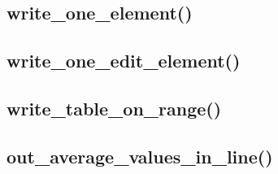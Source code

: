 \documentclass[12pt, a4paper]{article}
\begin{document}





\subsection{write\_one\_element()}






\subsection{write\_one\_edit\_element()}






\subsection{write\_table\_on\_range()}







\subsection{out\_average\_values\_in\_line()}


\end{document}
